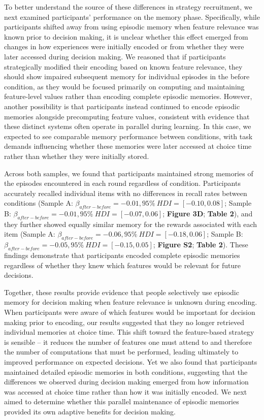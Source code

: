 \documentclass[10pt,letterpaper]{article}
\begin{document}
To better understand the source of these differences in strategy recruitment, we next examined participants' performance on the memory phase. Specifically, while participants shifted away from using episodic memory when feature relevance was known prior to decision making, it is unclear whether this effect emerged from changes in how experiences were initially encoded or from whether they were later accessed during decision making. We reasoned that if participants strategically modified their encoding based on known feature relevance, they should show impaired subsequent memory for individual episodes in the before condition, as they would be focused primarily on computing and maintaining feature-level values rather than encoding complete episodic memories. However, another possibility is that participants instead continued to encode episodic memories alongside precomputing feature values, consistent with evidence that these distinct systems often operate in parallel during learning\cite{nicholasUncertaintyAltersBalance2022a, bornsteinRemindersChoicesBias2017a, leeNeuralComputationsMediating2015, packardInactivationHippocampusCaudate1996, poldrackCompetitionMultipleMemory2003}. In this case, we expected to see comparable memory performance between conditions, with task demands influencing whether these memories were later accessed at choice time rather than whether they were initially stored.

Across both samples, we found that participants maintained strong memories of the episodes encountered in each round regardless of condition. Participants accurately recalled individual items with no differences in recall rates between conditions (Sample A: $\beta_{after-before} = -0.01, 95\% \ HDI = [-0.10, 0.08]$; Sample B: $\beta_{after-before} = -0.01, 95\% \ HDI = [-0.07, 0.06]$; \textbf{Figure 3D}; \textbf{Table 2}), and they further showed equally similar memory for the rewards associated with each item (Sample A: $\beta_{after-before} = -0.06, 95\% \ HDI = [-0.18, 0.06]$; Sample B: $\beta_{after-before} = -0.05, 95\% \ HDI = [-0.15, 0.05]$; \textbf{Figure S2}; \textbf{Table 2}). These findings demonstrate that participants encoded complete episodic memories regardless of whether they knew which features would be relevant for future decisions.

Together, these results provide evidence that people selectively use episodic memory for decision making when feature relevance is unknown during encoding. When participants were aware of which features would be important for decision making prior to encoding, our results suggested that they no longer retrieved individual memories at choice time. This shift toward the feature-based strategy is sensible -- it reduces the number of features one must attend to and therefore the number of computations that must be performed, leading ultimately to improved performance on expected decisions. Yet we also found that participants maintained detailed episodic memories in both conditions, suggesting that the differences we observed during decision making emerged from how information was accessed at choice time rather than how it was initially encoded. We next aimed to determine whether this parallel maintenance of episodic memories provided its own adaptive benefits for decision making.
\end{document}
